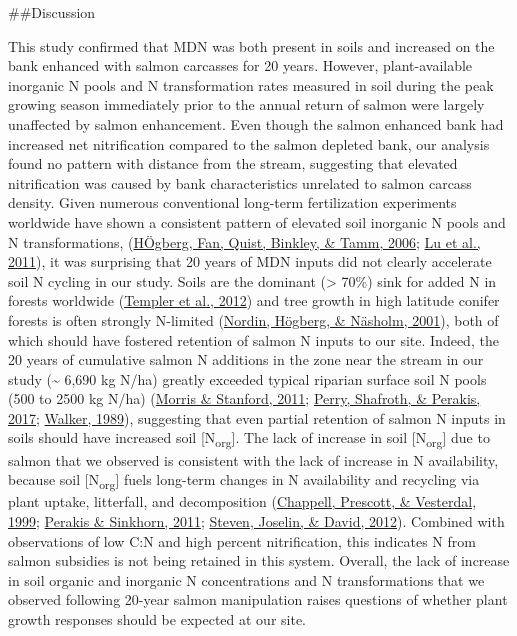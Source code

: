 \documentclass [11pt, proquest] {uwthesis}[2015/03/03]
\begin{document}
\#\#Discussion

This study confirmed that MDN was both present in soils and increased on the bank enhanced with salmon carcasses for 20 years. However, plant-available inorganic N pools and N transformation rates measured in soil during the peak growing season immediately prior to the annual return of salmon were largely unaffected by salmon enhancement. Even though the salmon enhanced bank had increased net nitrification compared to the salmon depleted bank, our analysis found no pattern with distance from the stream, suggesting that elevated nitrification was caused by bank characteristics unrelated to salmon carcass density. Given numerous conventional long-term fertilization experiments worldwide have shown a consistent pattern of elevated soil inorganic N pools and N transformations, (\protect\hyperlink{ref-Hogberg2006}{HÖgberg, Fan, Quist, Binkley, \& Tamm, 2006}; \protect\hyperlink{ref-Lu2011}{Lu et al., 2011}), it was surprising that 20 years of MDN inputs did not clearly accelerate soil N cycling in our study. Soils are the dominant (\textgreater{} 70\%) sink for added N in forests worldwide (\protect\hyperlink{ref-Templer2012}{Templer et al., 2012}) and tree growth in high latitude conifer forests is often strongly N-limited (\protect\hyperlink{ref-Nordin2001}{Nordin, Högberg, \& Näsholm, 2001}), both of which should have fostered retention of salmon N inputs to our site. Indeed, the 20 years of cumulative salmon N additions in the zone near the stream in our study (\textasciitilde{} 6,690 kg N/ha) greatly exceeded typical riparian surface soil N pools (500 to 2500 kg N/ha) (\protect\hyperlink{ref-Morris2011}{Morris \& Stanford, 2011}; \protect\hyperlink{ref-Perry2017}{Perry, Shafroth, \& Perakis, 2017}; \protect\hyperlink{ref-Walker1989}{Walker, 1989}), suggesting that even partial retention of salmon N inputs in soils should have increased soil {[}N\textsubscript{org}{]}. The lack of increase in soil {[}N\textsubscript{org}{]} due to salmon that we observed is consistent with the lack of increase in N availability, because soil {[}N\textsubscript{org}{]} fuels long-term changes in N availability and recycling via plant uptake, litterfall, and decomposition (\protect\hyperlink{ref-Chapell1999}{Chappell, Prescott, \& Vesterdal, 1999}; \protect\hyperlink{ref-Perakis2011}{Perakis \& Sinkhorn, 2011}; \protect\hyperlink{ref-Perakis2012}{Steven, Joselin, \& David, 2012}). Combined with observations of low C:N and high percent nitrification, this indicates N from salmon subsidies is not being retained in this system. Overall, the lack of increase in soil organic and inorganic N concentrations and N transformations that we observed following 20-year salmon manipulation raises questions of whether plant growth responses should be expected at our site.
\end{document}
